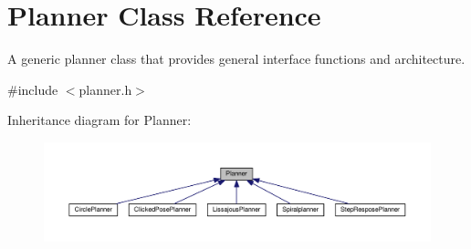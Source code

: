 \hypertarget{classPlanner}{}\section{Planner Class Reference}
\label{classPlanner}


A generic planner class that provides general interface functions and architecture.  




{\ttfamily \#include $<$planner.\+h$>$}



Inheritance diagram for Planner\+:\nopagebreak
\begin{figure}[H]
\begin{center}
\leavevmode
\includegraphics[width=350pt]{classPlanner__inherit__graph}
\end{center}
\end{figure}
